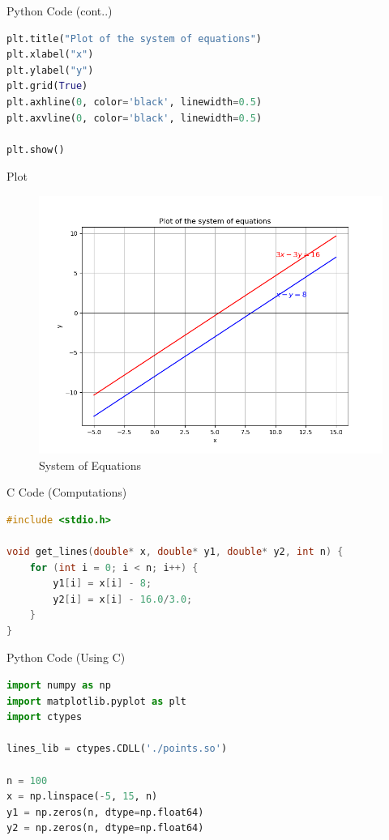 \documentclass{beamer}
\begin{document}
\begin{frame}[fragile]{Python Code (cont..)}
\begin{lstlisting}[language=Python]
plt.title("Plot of the system of equations")
plt.xlabel("x")
plt.ylabel("y")
plt.grid(True)
plt.axhline(0, color='black', linewidth=0.5)
plt.axvline(0, color='black', linewidth=0.5)

plt.show()
\end{lstlisting}
\end{frame}

\begin{frame}[fragile]{Plot}
\begin{figure}[H]\centering
\includegraphics[width=0.8\columnwidth]{figs/plt.png}
\caption{System of Equations}
\label{fig:plt}
\end{figure}
\end{frame}


\begin{frame}[fragile]{C Code (Computations)}
\begin{lstlisting}[language=C]
#include <stdio.h>

void get_lines(double* x, double* y1, double* y2, int n) {
    for (int i = 0; i < n; i++) {
        y1[i] = x[i] - 8; 
        y2[i] = x[i] - 16.0/3.0; 
    }
}
\end{lstlisting}
\end{frame}

\begin{frame}[fragile]{Python Code (Using C)}
\begin{lstlisting}[language=Python]
import numpy as np
import matplotlib.pyplot as plt
import ctypes

lines_lib = ctypes.CDLL('./points.so')

n = 100
x = np.linspace(-5, 15, n)
y1 = np.zeros(n, dtype=np.float64)
y2 = np.zeros(n, dtype=np.float64)
\end{lstlisting}
\end{frame}
\end{document}
